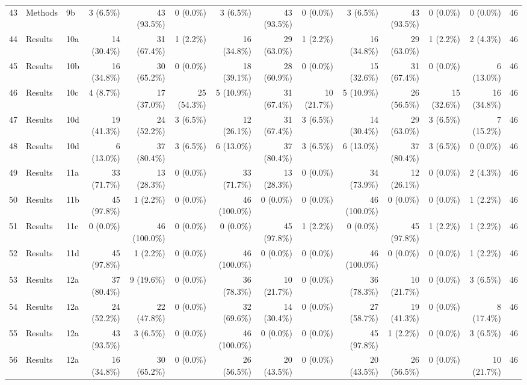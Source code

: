 \begin{longtable}{@{}rll*{11}{r}@{}}
43 & Methods & 9b & 3 (6.5\%) & 43 (93.5\%) & 0 (0.0\%) & 3 (6.5\%) & 43 (93.5\%) & 0 (0.0\%) & 3 (6.5\%) & 43 (93.5\%) & 0 (0.0\%) & 0 (0.0\%) & 46 \\
44 & Results & 10a & 14 (30.4\%) & 31 (67.4\%) & 1 (2.2\%) & 16 (34.8\%) & 29 (63.0\%) & 1 (2.2\%) & 16 (34.8\%) & 29 (63.0\%) & 1 (2.2\%) & 2 (4.3\%) & 46 \\
45 & Results & 10b & 16 (34.8\%) & 30 (65.2\%) & 0 (0.0\%) & 18 (39.1\%) & 28 (60.9\%) & 0 (0.0\%) & 15 (32.6\%) & 31 (67.4\%) & 0 (0.0\%) & 6 (13.0\%) & 46 \\
46 & Results & 10c & 4 (8.7\%) & 17 (37.0\%) & 25 (54.3\%) & 5 (10.9\%) & 31 (67.4\%) & 10 (21.7\%) & 5 (10.9\%) & 26 (56.5\%) & 15 (32.6\%) & 16 (34.8\%) & 46 \\
47 & Results & 10d & 19 (41.3\%) & 24 (52.2\%) & 3 (6.5\%) & 12 (26.1\%) & 31 (67.4\%) & 3 (6.5\%) & 14 (30.4\%) & 29 (63.0\%) & 3 (6.5\%) & 7 (15.2\%) & 46 \\
48 & Results & 10d & 6 (13.0\%) & 37 (80.4\%) & 3 (6.5\%) & 6 (13.0\%) & 37 (80.4\%) & 3 (6.5\%) & 6 (13.0\%) & 37 (80.4\%) & 3 (6.5\%) & 0 (0.0\%) & 46 \\
49 & Results & 11a & 33 (71.7\%) & 13 (28.3\%) & 0 (0.0\%) & 33 (71.7\%) & 13 (28.3\%) & 0 (0.0\%) & 34 (73.9\%) & 12 (26.1\%) & 0 (0.0\%) & 2 (4.3\%) & 46 \\
50 & Results & 11b & 45 (97.8\%) & 1 (2.2\%) & 0 (0.0\%) & 46 (100.0\%) & 0 (0.0\%) & 0 (0.0\%) & 46 (100.0\%) & 0 (0.0\%) & 0 (0.0\%) & 1 (2.2\%) & 46 \\
51 & Results & 11c & 0 (0.0\%) & 46 (100.0\%) & 0 (0.0\%) & 0 (0.0\%) & 45 (97.8\%) & 1 (2.2\%) & 0 (0.0\%) & 45 (97.8\%) & 1 (2.2\%) & 1 (2.2\%) & 46 \\
52 & Results & 11d & 45 (97.8\%) & 1 (2.2\%) & 0 (0.0\%) & 46 (100.0\%) & 0 (0.0\%) & 0 (0.0\%) & 46 (100.0\%) & 0 (0.0\%) & 0 (0.0\%) & 1 (2.2\%) & 46 \\
53 & Results & 12a & 37 (80.4\%) & 9 (19.6\%) & 0 (0.0\%) & 36 (78.3\%) & 10 (21.7\%) & 0 (0.0\%) & 36 (78.3\%) & 10 (21.7\%) & 0 (0.0\%) & 3 (6.5\%) & 46 \\
54 & Results & 12a & 24 (52.2\%) & 22 (47.8\%) & 0 (0.0\%) & 32 (69.6\%) & 14 (30.4\%) & 0 (0.0\%) & 27 (58.7\%) & 19 (41.3\%) & 0 (0.0\%) & 8 (17.4\%) & 46 \\
55 & Results & 12a & 43 (93.5\%) & 3 (6.5\%) & 0 (0.0\%) & 46 (100.0\%) & 0 (0.0\%) & 0 (0.0\%) & 45 (97.8\%) & 1 (2.2\%) & 0 (0.0\%) & 3 (6.5\%) & 46 \\
56 & Results & 12a & 16 (34.8\%) & 30 (65.2\%) & 0 (0.0\%) & 26 (56.5\%) & 20 (43.5\%) & 0 (0.0\%) & 20 (43.5\%) & 26 (56.5\%) & 0 (0.0\%) & 10 (21.7\%) & 46 \\

\end{longtable}
